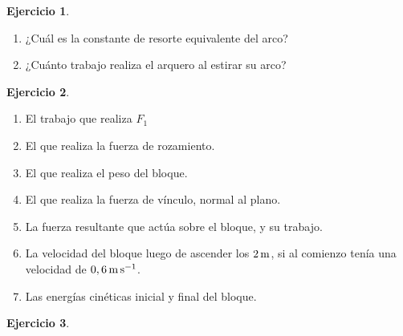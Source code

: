 \documentclass[a4paper,12pt,twoside]{book}
\newtheorem{ejercicio}{{Ejercicio}}[chapter]
\begin{document}
\begin{mdframed}[style=ejercicio-facil]
    \begin{ejercicio}
    \end{ejercicio}
    \begin{enumerate}
        \item ¿Cuál es la constante de resorte equivalente del arco?
        \item ¿Cuánto trabajo realiza el arquero al estirar su arco?
    \end{enumerate}
\end{mdframed}

\begin{mdframed}[style=ejercicio-facil]
    \begin{ejercicio}
    \end{ejercicio}
    \begin{enumerate}
        \item El trabajo que realiza $F_1$
        \item El que realiza la fuerza de rozamiento.
        \item El que realiza el peso del bloque.
        \item El que realiza la fuerza de vínculo, normal al plano.
        \item La fuerza resultante que actúa sobre el bloque, y su trabajo.
        \item La velocidad del bloque luego de ascender los $2\, \si{\metre}$, si al comienzo tenía una velocidad de
        $0,6\, \si{\metre\per\second}$.
        \item Las energías cinéticas inicial y final del bloque.
    \end{enumerate}
    \begin{center}
        \def\svgwidth{0.5\linewidth}
        
    \end{center}
\end{mdframed}

\begin{mdframed}[style=ejercicio-facil]
    \begin{ejercicio}
    \end{ejercicio}
    \begin{center}
        \def\svgwidth{0.5\linewidth}
        
    \end{center}
\end{mdframed}
\end{document}
